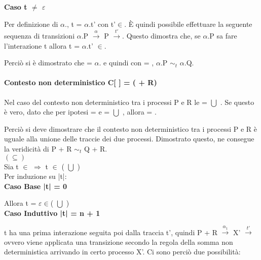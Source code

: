\textbf{Caso t $\not=$ $\varepsilon$}

Per definizione di $\alpha$., t = $\alpha$.t' con t'$\in$. È quindi possibile effettuare la seguente sequenza di transizioni $\alpha$.P $ \overset{\alpha}\rightarrow$ P $\overset{t'}\rightarrow $. Questo dimostra che, se $\alpha$.P sa fare l'interazione t allora t = $\alpha$.t' $\in$.

Perciò si è dimostrato che  = $\alpha$. e quindi con  = , $\alpha$.P $\sim_{t}$ $\alpha$.Q.
\\

\paragraph{Contesto non deterministico  C[ ] = (\hspace{0.3cm} + R)} \mbox{}

Nel caso del contesto non deterministico tra i processi P e R le  =  $\bigcup$ . Se questo è vero, dato che per ipotesi  =  e  =  $\bigcup$ , allora  =  .

Perciò si deve dimostrare che il contesto non deterministico tra i processi P e R è uguale alla unione delle traccie dei due processi. Dimostrato questo, ne consegue la veridicità di P + R $\sim_{t}$ Q + R.\\

$(\subseteq)$ \\

Sia t $\in$   $\Rightarrow$  t $\in$ ( $\bigcup$ )\\
Per induzione su |t|:
\\

\textbf{Caso Base |t| = 0}

Allora t = $\varepsilon \in$( $\bigcup$ )
\\

\textbf{Caso Induttivo |t| = n + 1}

t ha una prima interazione seguita poi dalla traccia t', quindi P + R $ \overset{\alpha_{1}}\rightarrow $ X' $\overset{t'}\rightarrow$ ovvero viene applicata una transizione secondo la regola della somma non deterministica arrivando in certo processo X'. Ci sono perciò due possibilità:

